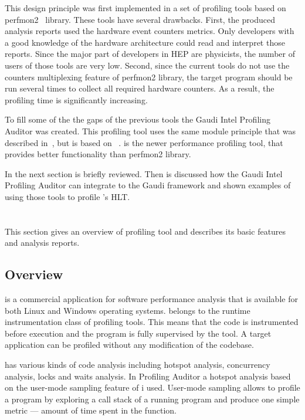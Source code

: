 This design principle was first implemented in a set of profiling tools based
on perfmon2~\cite{perfmon2} library. These tools have several drawbacks. First,
the produced analysis reports  used the  hardware event counters metrics. Only
developers with a good knowledge of the hardware  architecture could read and
interpret those reports. Since the major part of developers in HEP are
physicists, the number of users of those tools are very low. Second, since the
current tools do not use the counters multiplexing feature of perfmon2 library,
the target program should be run several times to collect all required hardware
counters. As a result, the profiling time is significantly increasing.

To fill some of the the gaps of the previous tools the Gaudi Intel
Profiling Auditor was created. This profiling tool uses the same module principle that was
described in~\cite{modular}, but is based on \iamp~\cite{vtune}.
\amp is the newer performance profiling tool, that provides better
functionality than perfmon2 library.

In the next section \iamp is briefly reviewed. Then is discussed how the Gaudi
Intel Profiling Auditor can integrate \amp to the Gaudi framework and shown
examples of using those tools to profile \lhcb's HLT.

\section[VTune Amplifier]{\iamp}
This section gives an overview of \iamp profiling tool and
describes its basic features and analysis reports.

\subsection{Overview}
\iamp is a commercial application for software performance analysis that is
available for both Linux and Windows operating systems. \amp belongs to the
runtime instrumentation class of profiling tools. This means that the code is
instrumented before execution and the program is fully supervised by the tool.
A target application can be profiled without any modification of the codebase.

\iamp has  various kinds of code analysis including hotspot analysis,
concurrency analysis, locks and waits analysis. In Profiling Auditor a
hotspot analysis based on the user-mode sampling feature of \amp i used.
User-mode sampling allows to profile a program by exploring a call stack of a
running program and produce one simple metric --- amount of time spent in the
function.

